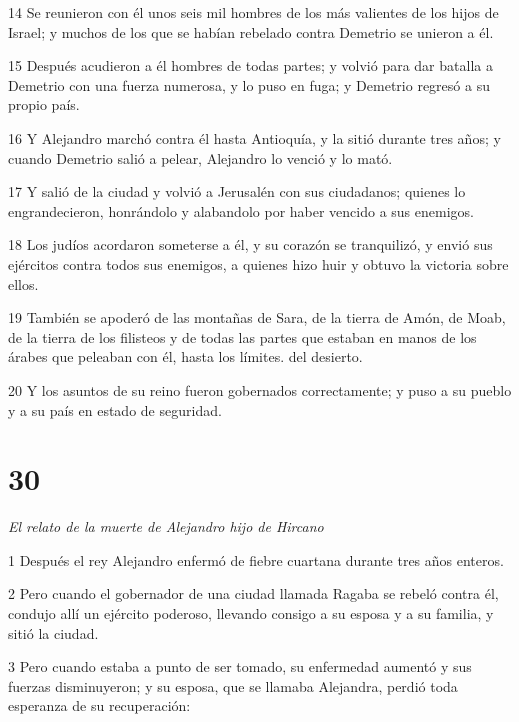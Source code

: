 \par 14 Se reunieron con él unos seis mil hombres de los más valientes de los hijos de Israel; y muchos de los que se habían rebelado contra Demetrio se unieron a él.

\par 15 Después acudieron a él hombres de todas partes; y volvió para dar batalla a Demetrio con una fuerza numerosa, y lo puso en fuga; y Demetrio regresó a su propio país.

\par 16 Y Alejandro marchó contra él hasta Antioquía, y la sitió durante tres años; y cuando Demetrio salió a pelear, Alejandro lo venció y lo mató.

\par 17 Y salió de la ciudad y volvió a Jerusalén con sus ciudadanos; quienes lo engrandecieron, honrándolo y alabandolo por haber vencido a sus enemigos.

\par 18 Los judíos acordaron someterse a él, y su corazón se tranquilizó, y envió sus ejércitos contra todos sus enemigos, a quienes hizo huir y obtuvo la victoria sobre ellos.

\par 19 También se apoderó de las montañas de Sara, de la tierra de Amón, de Moab, de la tierra de los filisteos y de todas las partes que estaban en manos de los árabes que peleaban con él, hasta los límites. del desierto.

\par 20 Y los asuntos de su reino fueron gobernados correctamente; y puso a su pueblo y a su país en estado de seguridad.

\chapter{30}

\par \textit{El relato de la muerte de Alejandro hijo de Hircano}

\par 1 Después el rey Alejandro enfermó de fiebre cuartana durante tres años enteros.

\par 2 Pero cuando el gobernador de una ciudad llamada Ragaba se rebeló contra él, condujo allí un ejército poderoso, llevando consigo a su esposa y a su familia, y sitió la ciudad.

\par 3 Pero cuando estaba a punto de ser tomado, su enfermedad aumentó y sus fuerzas disminuyeron; y su esposa, que se llamaba Alejandra, perdió toda esperanza de su recuperación:

